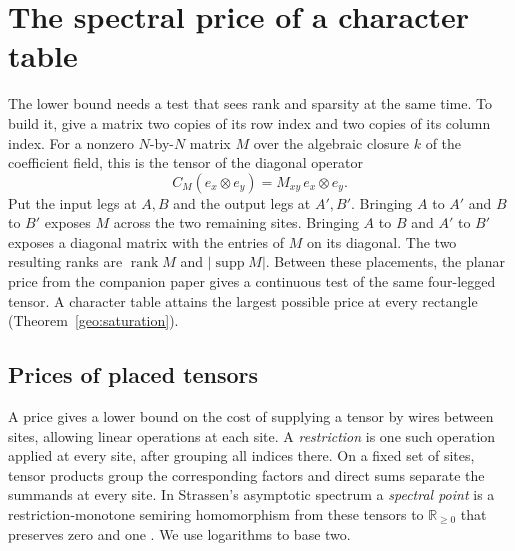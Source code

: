 \section{The spectral price of a character table}\label{geo:section}

The lower bound needs a test that sees rank and sparsity at the same
time. To build it, give a matrix two copies of its row index and two
copies of its column index. For a nonzero $N$-by-$N$ matrix $M$ over
the algebraic closure $k$ of the coefficient field, this is the tensor
of the diagonal operator
\[
    C_M(e_x\otimes e_y)=M_{xy}\,e_x\otimes e_y .
\]
Put the input legs at $A,B$ and the output legs at $A',B'$. Bringing
$A$ to $A'$ and $B$ to $B'$ exposes $M$ across the two remaining sites.
Bringing $A$ to $B$ and $A'$ to $B'$ exposes a diagonal matrix with the
entries of $M$ on its diagonal. The two resulting ranks are
$\operatorname{rank}M$ and $|\operatorname{supp}M|$.
Between these placements, the planar price from the companion paper
\cite{oaG} gives a continuous test of the same four-legged tensor.
A character table attains the largest possible price at every rectangle
(Theorem~\ref{geo:saturation}).

\subsection{Prices of placed tensors}

A price gives a lower bound on the cost of supplying a tensor by
wires between sites, allowing linear operations at each site. A
\emph{restriction} is one such operation applied at every site, after
grouping all indices there. On a fixed set of sites, tensor products
group the corresponding factors and direct sums separate the summands
at every site. In Strassen's asymptotic spectrum a \emph{spectral
point} is a restriction-monotone semiring homomorphism from these
tensors to $\mathbb R_{\ge0}$ that preserves zero and one
\cite{StrassenSpectrum}. We use logarithms to base two.

